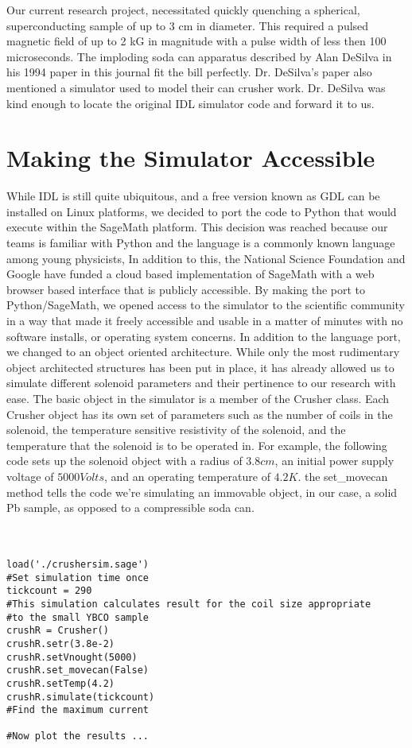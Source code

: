 \documentclass[prb,preprint]{revtex4-1}
\begin{document}
Our current research project, necessitated quickly quenching a spherical, superconducting sample of up to 3 cm in diameter.  This required a pulsed magnetic field of up to 2 kG in magnitude with a pulse width of less then 100 microseconds.  The imploding soda can apparatus described by Alan DeSilva in his 1994 paper\cite{desilvacan} in this journal fit the bill perfectly.  Dr. DeSilva's paper also mentioned a simulator used to model their can crusher work.  Dr. DeSilva was kind enough to locate the original IDL simulator code and forward it to us.  \\
\section{Making the Simulator Accessible}
While IDL is still quite ubiquitous, and a free version known as GDL can be installed on Linux platforms, we decided to port the code to Python that would execute within the SageMath platform.  This decision was reached because our teams is familiar with Python and the language is a commonly known language among young physicists, In addition to this, the National Science Foundation and Google have funded a cloud based implementation of SageMath with a web browser based interface that is publicly accessible.  By making the port to Python/SageMath, we opened access to the simulator to the scientific community in a way that made it freely accessible and usable in a matter of minutes with no software installs, or operating system concerns.
In addition to the language port, we changed to an object oriented architecture.  While only the most rudimentary object architected structures has been put in place, it has already allowed us to simulate different solenoid parameters and their pertinence to our research with ease.  The basic object in the simulator is a member of the Crusher class.  Each Crusher object has its own set of parameters such as the number of coils in the solenoid, the temperature sensitive resistivity of the solenoid, and the temperature that the solenoid is to be operated in.  For example, the following code sets up the solenoid object with a radius of $3.8 cm$, an initial power supply voltage of $5000 Volts$, and an operating temperature of $4.2 K$.  the set\_movecan method tells the code we're simulating an immovable object, in our case, a solid Pb sample, as opposed to a compressible soda can.
\\\\\\
\lstset{language=Python}
\begin{lstlisting}[frame=single]
load('./crushersim.sage')
#Set simulation time once
tickcount = 290
#This simulation calculates result for the coil size appropriate
#to the small YBCO sample
crushR = Crusher()
crushR.setr(3.8e-2)
crushR.setVnought(5000)
crushR.set_movecan(False)
crushR.setTemp(4.2)
crushR.simulate(tickcount)
#Find the maximum current

#Now plot the results ...
\end{lstlisting}
\end{document}
